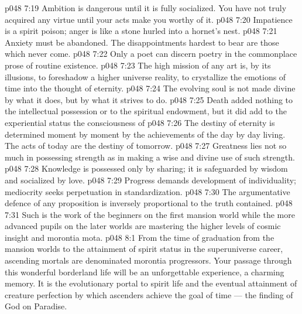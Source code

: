 \vs p048 7:19 \bibnobreakspace Ambition is dangerous until it is fully socialized. You have not truly acquired any virtue until your acts make you worthy of it.
\vs p048 7:20 \bibnobreakspace Impatience is a spirit poison; anger is like a stone hurled into a hornet’s nest.
\vs p048 7:21 \bibnobreakspace Anxiety must be abandoned. The disappointments hardest to bear are those which never come.
\vs p048 7:22 \bibnobreakspace Only a poet can discern poetry in the commonplace prose of routine existence.
\vs p048 7:23 \bibnobreakspace The high mission of any art is, by its illusions, to foreshadow a higher universe reality, to crystallize the emotions of time into the thought of eternity.
\vs p048 7:24 \bibnobreakspace The evolving soul is not made divine by what it does, but by what it strives to do.
\vs p048 7:25 \bibnobreakspace Death added nothing to the intellectual possession or to the spiritual endowment, but it did add to the experiential status the consciousness of 
\vs p048 7:26 \bibnobreakspace The destiny of eternity is determined moment by moment by the achievements of the day by day living. The acts of today are the destiny of tomorrow.
\vs p048 7:27 \bibnobreakspace Greatness lies not so much in possessing strength as in making a wise and divine use of such strength.
\vs p048 7:28 \bibnobreakspace Knowledge is possessed only by sharing; it is safeguarded by wisdom and socialized by love.
\vs p048 7:29 \bibnobreakspace Progress demands development of individuality; mediocrity seeks perpetuation in standardization.
\vs p048 7:30 \bibnobreakspace The argumentative defence of any proposition is inversely proportional to the truth contained.
\vs p048 7:31 \pc Such is the work of the beginners on the first mansion world while the more advanced pupils on the later worlds are mastering the higher levels of cosmic insight and morontia mota.
\vs p048 8:1 From the time of graduation from the mansion worlds to the attainment of spirit status in the superuniverse career, ascending mortals are denominated morontia progressors. Your passage through this wonderful borderland life will be an unforgettable experience, a charming memory. It is the evolutionary portal to spirit life and the eventual attainment of creature perfection by which ascenders achieve the goal of time --- the finding of God on Paradise.
